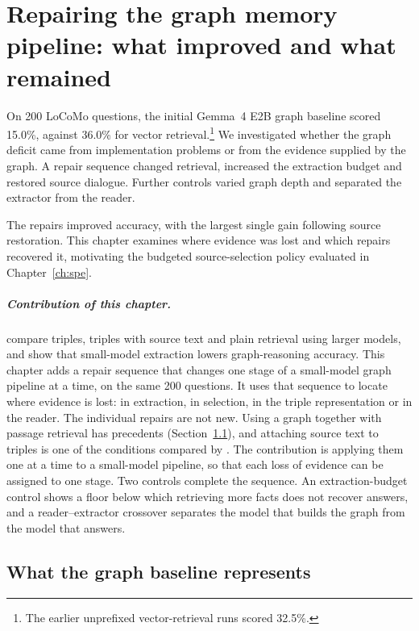 
\chapter{Repairing the graph memory pipeline: what improved and what remained}
\label{ch:graph_mechanisms}

On 200 LoCoMo questions, the initial Gemma~4 E2B graph baseline scored 15.0\%, against
36.0\% for vector retrieval.\footnote{The earlier unprefixed vector-retrieval runs scored
32.5\%.} We investigated whether
the graph deficit came from implementation problems
or from the evidence supplied by the graph. A repair sequence changed retrieval, increased
the extraction budget and restored source dialogue. Further controls varied graph depth
and separated the extractor from the reader.

The repairs improved accuracy, with the largest single gain following source restoration.
This chapter examines where evidence was lost and which repairs recovered it, motivating
the budgeted source-selection policy evaluated in Chapter~\ref{ch:spe}.

\paragraph{Contribution of this chapter.} \citet{rag_vs_graphrag} compare triples, triples with
source text and plain retrieval using larger models, and \citet{kelesis2026} show that small-model
extraction lowers graph-reasoning accuracy. This chapter adds a repair sequence that changes one
stage of a small-model graph pipeline at a time, on the same 200 questions. It uses that sequence
to locate where evidence is lost: in extraction, in selection, in the triple representation or in
the reader. The individual repairs are not new. Using a graph together with passage retrieval has
precedents (Section~\ref{sec:ch6_scope}), and attaching source text to triples is one of the
conditions compared by \citet{rag_vs_graphrag}. The contribution
is applying them one at a time to a small-model pipeline, so that each loss of evidence can be
assigned to one stage. Two controls complete the sequence. An extraction-budget control shows a floor below
which retrieving more facts does not recover answers, and a reader--extractor crossover separates
the model that builds the graph from the model that answers.

\section{What the graph baseline represents}
\label{sec:ch6_scope}

